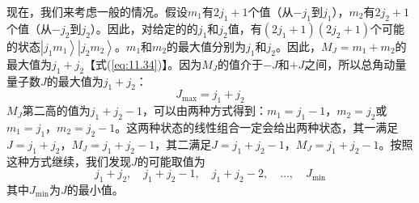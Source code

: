     现在，我们来考虑一般的情况。假设$m_1$有$2j_1+1$个值（从$-j_1$到$j_1$），$m_2$有$2j_2+1$个值（从$-j_2$到$j_2$）。因此，对给定的的$j_1$和$j_2$值，有$\left(2j_1+1\right)\left(2j_2+1\right)$个可能的状态$\left|j_1m_1\right\rangle\left|j_2m_2\right\rangle$。$m_1$和$m_2$的最大值分别为$j_1$和$j_2$。因此，$M_J = m_1 + m_2$的最大值为$j_1 + j_2$【式(\ref{eq:11.34})】。因为$M_J$的值介于$-J$和$+J$之间，所以总角动量量子数$J$的最大值为$j_1 + j_2$：
    \begin{equation}
        J_{\max} = j_1 + j_2
        \label{eq:11.35}
    \end{equation}
    $M_J$第二高的值为$j_1 + j_2 - 1$，可以由两种方式得到：$m_1 = j_1 - 1$，$m_2 = j_2$或$m_1 = j_1$，$m_2 = j_2 - 1$。这两种状态的线性组合一定会给出两种状态，其一满足$J = j_1 + j_2$，$M_J = j_1 + j_2 - 1$，其二满足$J = j_1 + j_2 - 1$，$M_J = j_1 + j_2 - 1$。按照这种方式继续，我们发现$J$的可能取值为
    \begin{equation*}
        j_1 + j_2, \quad j_1 + j_2 - 1, \quad j_1 + j_2 - 2, \quad \ldots, \quad J_{\min}
    \end{equation*}
    其中$J_{\min}$为$J$的最小值。

